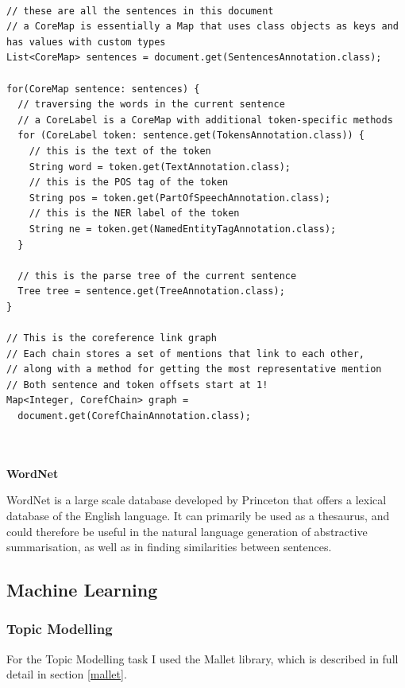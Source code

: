 \documentclass[12pt]{article}
\begin{document}
\begin{lstlisting}[style=MyJava, firstnumber=1, caption={Analysing an annotated document using Stanford's CoreNLP}]

// these are all the sentences in this document
// a CoreMap is essentially a Map that uses class objects as keys and has values with custom types
List<CoreMap> sentences = document.get(SentencesAnnotation.class);

for(CoreMap sentence: sentences) {
  // traversing the words in the current sentence
  // a CoreLabel is a CoreMap with additional token-specific methods
  for (CoreLabel token: sentence.get(TokensAnnotation.class)) {
    // this is the text of the token
    String word = token.get(TextAnnotation.class);
    // this is the POS tag of the token
    String pos = token.get(PartOfSpeechAnnotation.class);
    // this is the NER label of the token
    String ne = token.get(NamedEntityTagAnnotation.class);
  }

  // this is the parse tree of the current sentence
  Tree tree = sentence.get(TreeAnnotation.class);
}

// This is the coreference link graph
// Each chain stores a set of mentions that link to each other,
// along with a method for getting the most representative mention
// Both sentence and token offsets start at 1!
Map<Integer, CorefChain> graph = 
  document.get(CorefChainAnnotation.class); 
 
\end{lstlisting}

\textbf{\\ WordNet}

\label{WordNet}

WordNet is a large scale database developed by Princeton that offers a lexical database of the English language. It can primarily be used as a thesaurus, and could therefore be useful in the natural language generation of abstractive summarisation, as well as in finding similarities between sentences.

\subsection{Machine Learning}

\subsubsection{Topic Modelling}

For the Topic Modelling task I used the Mallet library, which is described in full detail in section \ref{mallet}.
\end{document}
